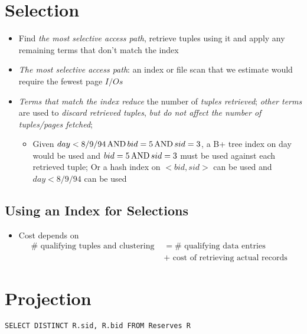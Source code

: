 \section{Selection}

  \begin{itemize}
    \item Find \emph{the most selective access path}, retrieve tuples using it and apply
    any remaining terms that don't match the index
    \item \emph{The most selective access path}: an index or file scan that
    we estimate would require the fewest page $ I/Os $
    \item \emph{Terms that match the index reduce} the number of \emph{tuples retrieved};
    \emph{other terms} are used to \emph{discard retrieved tuples}, \emph{but do not
    affect the number of tuples/pages fetched};
    \begin{itemize}
      \item Given $ day < 8/9/94 \operatorname{AND} bid = 5 \operatorname{AND} sid = 3 $, a B+ tree index
      on day would be used and $ bid = 5 \operatorname{AND} sid = 3 $ must be used against
      each retrieved tuple; Or a hash index on $ <bid, sid> $ can be used
      and $ day < 8/9/94 $ can be used
    \end{itemize}
  \end{itemize}

  \subsection{Using an Index for Selections}

    \begin{itemize}
      \item Cost depends on
      \begin{align*}
        \#\text{ qualifying tuples and clustering }
          &= \#\text{ qualifying data entries } \\
          &+ \text{ cost of retrieving actual records }
      \end{align*}
    \end{itemize}

\section{Projection}

  \begin{lstlisting}
SELECT DISTINCT R.sid, R.bid FROM Reserves R
  \end{lstlisting}

